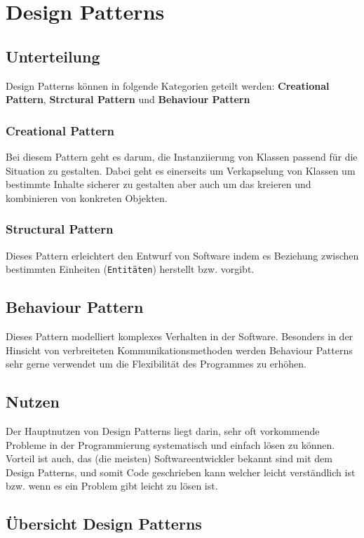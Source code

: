 
\section{Design Patterns}
\cite{Wikiped}
\subsection{Unterteilung}
Design Patterns können in folgende Kategorien geteilt werden: \textbf{Creational Pattern}, \textbf{Strctural Pattern} und \textbf{Behaviour Pattern}

\subsubsection{Creational Pattern}
Bei diesem Pattern geht es darum, die Instanziierung von Klassen passend für die Situation zu gestalten. Dabei geht es einerseits um Verkapselung von Klassen um bestimmte Inhalte sicherer zu gestalten aber auch um das kreieren und kombinieren von konkreten Objekten.

\subsubsection{Structural Pattern}
Dieses Pattern erleichtert den Entwurf von Software indem es Beziehung zwischen bestimmten Einheiten (\verb|Entitäten|) herstellt bzw. vorgibt.

\subsection{Behaviour Pattern}
Dieses Pattern modelliert komplexes Verhalten in der Software. Besonders in der Hinsicht von verbreiteten Kommunikationsmethoden werden Behaviour Patterns sehr gerne verwendet um die Flexibilität des Programmes zu erhöhen. 

\subsection{Nutzen}
Der Hauptnutzen von Design Patterns liegt darin, sehr oft vorkommende Probleme in der Programmierung systematisch und einfach lösen zu können. Vorteil ist auch, das (die meisten) Softwareentwickler bekannt sind mit dem Design Patterns, und somit Code geschrieben kann welcher leicht verständlich ist bzw. wenn es ein Problem gibt leicht zu lösen ist.

\subsection{Übersicht Design Patterns}
